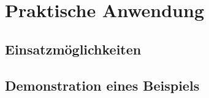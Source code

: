 \chapter{Praktische Anwendung}

\section{Einsatzmöglichkeiten}

\section{Demonstration eines Beispiels}

